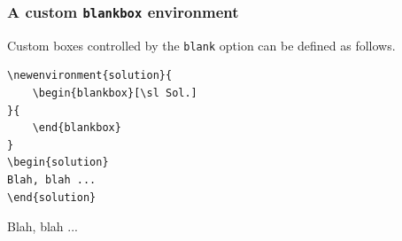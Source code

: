 \documentclass{article}
\theoremstyle{break}
\newtheorem{example}[theorem]{\examplename}
\begin{document}
%

\subsubsection{A custom {\tt blankbox} environment}
Custom boxes controlled by the {\tt blank} option can be defined as follows.
%
\begin{Verbatim}[frame=single]
\newenvironment{solution}{
    \begin{blankbox}[\sl Sol.]
}{
    \end{blankbox}
}
\begin{solution}
Blah, blah ...
\end{solution}
\end{Verbatim}

\newenvironment{solution}{
	\begin{blankbox}[\sl Sol.]
}{
	\end{blankbox}
}
\begin{solution}
Blah, blah ...
\end{solution}

\end{document}

